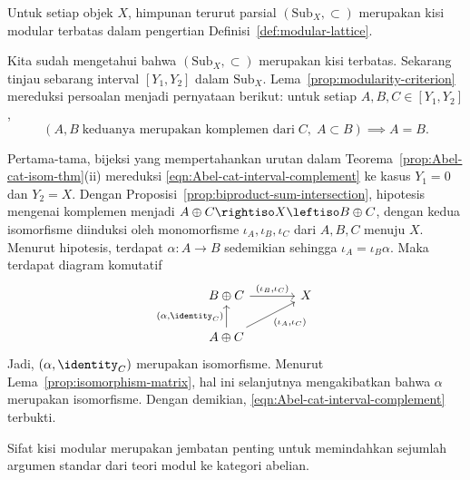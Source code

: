 \begin{teorema}\label{prop:subobject-modularity}
	Untuk setiap objek $X$, himpunan terurut parsial
	$(\mathrm{Sub}_X,\subset)$ merupakan kisi modular terbatas dalam
	pengertian Definisi~\ref{def:modular-lattice}.
\end{teorema}
\begin{bukti}
	Kita sudah mengetahui bahwa $(\mathrm{Sub}_X,\subset)$ merupakan kisi
	terbatas. Sekarang tinjau sebarang interval $[Y_1,Y_2]$ dalam
	$\mathrm{Sub}_X$. Lema~\ref{prop:modularity-criterion} mereduksi persoalan
	menjadi pernyataan berikut: untuk setiap $A,B,C\in[Y_1,Y_2]$,
	\begin{equation}\label{eqn:Abel-cat-interval-complement}
		\left( A, B \;\text{keduanya merupakan komplemen dari}\; C, \; A \subset B \right) \implies A = B.
	\end{equation}

	Pertama-tama, bijeksi yang mempertahankan urutan dalam
	Teorema~\ref{prop:Abel-cat-isom-thm}(ii) mereduksi
	\eqref{eqn:Abel-cat-interval-complement} ke kasus $Y_1=0$ dan $Y_2=X$.
	Dengan Proposisi~\ref{prop:biproduct-sum-intersection}, hipotesis mengenai
	komplemen menjadi
	$A\oplus C\rightiso X\leftiso B\oplus C$, dengan kedua isomorfisme
	diinduksi oleh monomorfisme
	$\iota_A,\iota_B,\iota_C$ dari $A,B,C$ menuju $X$. Menurut hipotesis,
	terdapat $\alpha:A\to B$ sedemikian sehingga
	$\iota_A=\iota_B\alpha$. Maka terdapat diagram komutatif
	\[\begin{tikzcd}[column sep=large]
		B \oplus C \arrow[r, "{(\iota_B, \iota_C)}"] & X \\
		A \oplus C \arrow[ru, "{(\iota_A, \iota_C)}"'] \arrow[u, "{(\alpha, \identity_C)}"] &
	\end{tikzcd}\]
	Jadi, $(\alpha,\identity_C)$ merupakan isomorfisme. Menurut
	Lema~\ref{prop:isomorphism-matrix}, hal ini selanjutnya mengakibatkan bahwa
	$\alpha$ merupakan isomorfisme. Dengan demikian,
	\eqref{eqn:Abel-cat-interval-complement} terbukti.
\end{bukti}

Sifat kisi modular merupakan jembatan penting untuk memindahkan sejumlah
argumen standar dari teori modul ke kategori abelian.
